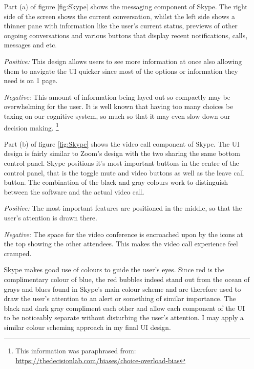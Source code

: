 Part (a) of figure \ref{fig:Skype} shows the messaging
component of Skype. The right side of the screen shows the 
current conversation, whilst the left side shows a thinner 
pane with information like the user's current status, 
previews of other ongoing conversations and various buttons
that display recent notifications, calls, messages and etc.
\\ \vspace{0.2cm}

\textit{Positive:} This design allows users to see more
information at once also allowing them to navigate the UI
quicker since most of the options or information they need is 
on 1 page. \\ \vspace{0.2cm}

\textit{Negative:} This amount of information being layed out
so compactly may be overwhelming for the user. It is well 
known that having too many choices be taxing on our cognitive
system, so much so that it may even slow down our decision 
making. \footnote{This information was paraphrased from:
\url{https://thedecisionlab.com/biases/choice-overload-bias}} \\ \vspace{0.2cm}

Part (b) of figure \ref{fig:Skype} shows the video call
component of Skype. The UI design is fairly similar to Zoom's
design with the two sharing the same bottom control panel. 
Skype positions it's most important buttons in the centre of the
control panel, that is the toggle mute and video buttons as well 
as the leave call button. The combination of the black and gray 
colours work to distinguish between the software and the actual
video call.\\ \vspace{0.2cm}

\textit{Positive:} The most important features are positioned in 
the middle, so that the user's attention is drawn there.
\\ \vspace{0.2cm}

\textit{Negative:} The space for the video conference is
encroached upon by the icons at the top showing the other
attendees. This makes the video call experience feel cramped.\\ 
\vspace{0.2cm}

Skype makes good use of colours to guide the user's eyes. Since red 
is the complimentary colour of blue, the red 
bubbles indeed stand out from the ocean of grays and blues found in
Skype's main colour scheme
and are therefore used to draw the user's attention to an alert or 
something of similar importance. The black and dark gray 
compliment each other and allow each component of the UI to 
be noticeably separate without disturbing the user's attention.
I may apply a similar colour scheming approach in my final 
UI design.

